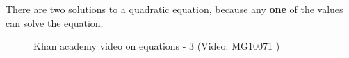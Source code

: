         \label{m39247*id150373}There are two solutions to a
quadratic equation, because any \textbf{one} of the values can solve the
equation. \par 

\label{m39247*eip-388}
    \setcounter{subfigure}{0}


	\begin{figure}[H] %
    
    
    \textnormal{Khan academy video on equations - 3}\vspace{.1in} \nopagebreak
  \label{m39247*yt-media3}\label{m39247*yt-video3}
             { (Video:  MG10071 )}
      
      \vspace{2pt}
    \vspace{.1in}
    
    

 \end{figure}   

    \addtocounter{footnote}{-0}
    \par \label{m39247*secfhsst!!!underscore!!!id2133}\vspace{.5cm} 
      
